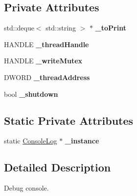 \subsection*{Private Attributes}
\begin{DoxyCompactItemize}
\item 
std\+::deque$<$ std\+::string $>$ $\ast$ {\bfseries \+\_\+to\+Print}\hypertarget{class_ensum_1_1_utils_1_1_console_log_a14ea8d692b09b00c972baca65563be78}{}\label{class_ensum_1_1_utils_1_1_console_log_a14ea8d692b09b00c972baca65563be78}

\item 
H\+A\+N\+D\+LE {\bfseries \+\_\+thread\+Handle}\hypertarget{class_ensum_1_1_utils_1_1_console_log_aa93afd55081441f111fc804da614913e}{}\label{class_ensum_1_1_utils_1_1_console_log_aa93afd55081441f111fc804da614913e}

\item 
H\+A\+N\+D\+LE {\bfseries \+\_\+write\+Mutex}\hypertarget{class_ensum_1_1_utils_1_1_console_log_a1b8a903c69d744529d98d29f728cafcf}{}\label{class_ensum_1_1_utils_1_1_console_log_a1b8a903c69d744529d98d29f728cafcf}

\item 
D\+W\+O\+RD {\bfseries \+\_\+thread\+Address}\hypertarget{class_ensum_1_1_utils_1_1_console_log_a5258e193fd534462a6f5ff3a3a0a9072}{}\label{class_ensum_1_1_utils_1_1_console_log_a5258e193fd534462a6f5ff3a3a0a9072}

\item 
bool {\bfseries \+\_\+shutdown}\hypertarget{class_ensum_1_1_utils_1_1_console_log_abfe63ce28323a8554b5515ef684e582e}{}\label{class_ensum_1_1_utils_1_1_console_log_abfe63ce28323a8554b5515ef684e582e}

\end{DoxyCompactItemize}
\subsection*{Static Private Attributes}
\begin{DoxyCompactItemize}
\item 
static \hyperlink{class_ensum_1_1_utils_1_1_console_log}{Console\+Log} $\ast$ {\bfseries \+\_\+instance}\hypertarget{class_ensum_1_1_utils_1_1_console_log_ace276a80cd230798d08539f05816cdcb}{}\label{class_ensum_1_1_utils_1_1_console_log_ace276a80cd230798d08539f05816cdcb}

\end{DoxyCompactItemize}


\subsection{Detailed Description}
Debug console. 

